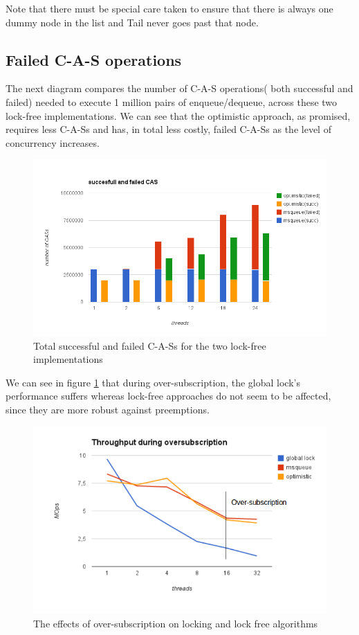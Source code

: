 Note that there must be special care taken to ensure that there is always one dummy node in the list and Tail never goes past that node.

\subsection{Failed C-A-S operations}

The next diagram compares the number of C-A-S operations( both successful and failed) needed to execute 1 million pairs of enqueue/dequeue, across these two lock-free implementations. We can see that the optimistic approach, as promised, requires less C-A-Ss and has, in total less costly, failed C-A-Ss as the level of concurrency increases.

\begin{figure}
 \centering
  \includegraphics[scale=0.5]{failed_cas.png}
\caption{Total successful and failed C-A-Ss for the two lock-free implementations}
\end{figure}

We can see in figure \ref{queues_oversubscription} that during over-subscription, the global lock's performance suffers whereas lock-free approaches do not seem to be affected, since they are more robust against preemptions.


\begin{figure}
 \centering
  \includegraphics[scale=0.5]{queues_oversubscription.png}
\caption{The effects of over-subscription on locking and lock free algorithms}
\label{queues_oversubscription}
\end{figure}

